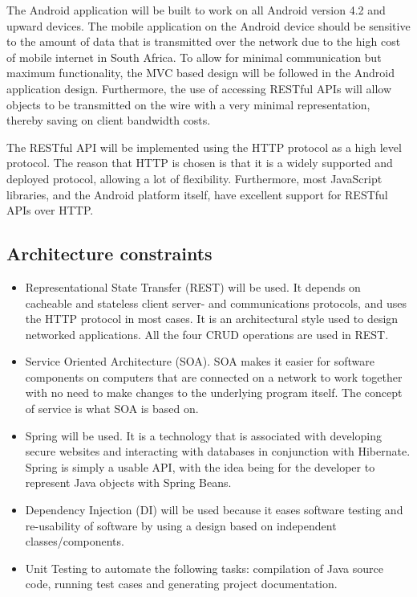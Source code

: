 \documentclass[a4paper,10pt]{article}
\begin{document}
The Android application will be built to work on all Android version 4.2 and upward devices. The mobile application on the Android device should be sensitive to the amount of data that is transmitted over the network due to the high cost of mobile internet in South Africa. To allow for minimal communication but maximum functionality, the MVC based design will be followed in the Android application design.  Furthermore, the use of accessing RESTful APIs will allow objects to be transmitted on the wire with a very minimal representation, thereby saving on client bandwidth costs.

The RESTful API will be implemented using the HTTP protocol as a high level protocol. The reason that HTTP is chosen is that it is a widely supported and deployed protocol, allowing a lot of flexibility. Furthermore, most JavaScript libraries, and the Android platform itself, have excellent support for RESTful APIs over HTTP.

\subsection{Architecture constraints}
\begin{itemize}
\item Representational State Transfer (REST) will be used. It depends on cacheable and stateless client server- and communications protocols, and uses the HTTP protocol in most cases. It is an architectural style used to design networked applications. All the four CRUD operations are used in REST. 
\item Service Oriented Architecture (SOA). SOA makes it easier for software components on computers that are connected on a network to work together with no need to make changes to the underlying program itself. The concept of service is what SOA is based on.
\item Spring will be used. It is a technology that is associated with developing secure websites and interacting with databases in conjunction with Hibernate. Spring is simply a usable API, with the idea being for the developer to represent Java objects with Spring Beans.
\item Dependency Injection (DI) will be used because it eases software testing and re-usability of software by using a design based on independent classes/components.
\item Unit Testing to automate the following tasks: compilation of Java source code, running test cases and generating project documentation.
\end{itemize}
\end{document}
